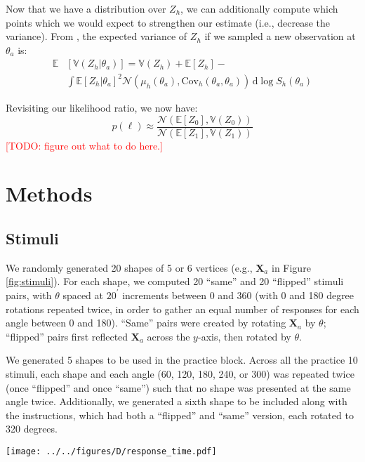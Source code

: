 \documentclass[10pt,letterpaper]{article}
\newcommand{\TODO}[1]{\textcolor{red}{[TODO: #1]}}
\newcommand{\Xa}[0]{\mathbf{X}_a}
\newcommand{\dif}[0]{\,\mathrm{d}}
\begin{document}
Now that we have a distribution over $Z_h$, we can additionally
compute which points which we would expect to strengthen our estimate
(i.e., decrease the variance). From \cite{Osborne:2012tm}, the
expected variance of $Z_h$ if we sampled a new observation at
$\theta_a$ is:
\begin{align}
\mathbb{E}&[\mathbb{V}(Z_h|\theta_a)]=\mathbb{V}(Z_h) + \mathbb{E}[Z_h] - \\
&\int \mathbb{E}[Z_h|\theta_{a}]^2 \mathcal{N}(\mu_h(\theta_a), \mathrm{Cov}_h(\theta_a, \theta_a))\dif\log S_h(\theta_a)\nonumber
\label{ref:expected-variance}
\end{align}

Revisiting our likelihood ratio, we now have:
\begin{equation}
p(\ell)\approx\frac{\mathcal{N}(\mathbb{E}[Z_0], \mathbb{V}(Z_0))}{\mathcal{N}(\mathbb{E}[Z_1], \mathbb{V}(Z_1))}
\end{equation}
\TODO{figure out what to do here.}


\section{Methods}


\subsection{Stimuli}

We randomly generated 20 shapes of 5 or 6 vertices (e.g., $\Xa$ in
Figure \ref{fig:stimuli}). For each shape, we computed 20 ``same'' and
20 ``flipped'' stimuli pairs, with $\theta$ spaced at $20^\prime$
increments between 0 and 360 (with 0 and 180 degree rotations repeated
twice, in order to gather an equal number of responses for each angle
between 0 and 180). ``Same'' pairs were created by rotating $\Xa$ by
$\theta$; ``flipped'' pairs first reflected $\Xa$ across the $y$-axis,
then rotated by $\theta$.

We generated 5 shapes to be used in the practice block. Across all the
practice 10 stimuli, each shape and each angle (60, 120, 180, 240, or
300) was repeated twice (once ``flipped'' and once ``same'') such that
no shape was presented at the same angle twice. Additionally, we
generated a sixth shape to be included along with the instructions,
which had both a ``flipped'' and ``same'' version, each rotated to 320
degrees.

\begin{figure*}[t]
  \begin{center}
    \texttt{[image: ../../figures/D/response\_time.pdf]}
    \caption{\textbf{Response times.} \TODO{}}
    \label{fig:response-times}
  \end{center}
\end{figure*}
\end{document}

